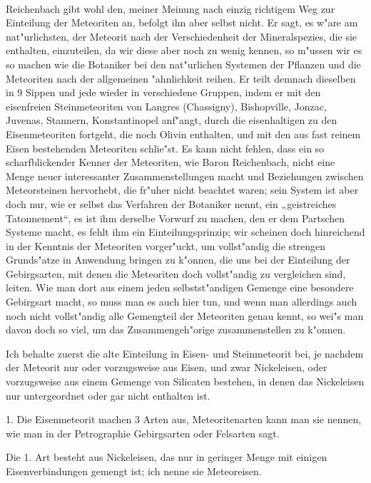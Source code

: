\documentclass[a4paper, 11pt, oneside]{article}
\begin{document}
\paragraph{}
Reichenbach gibt wohl den, meiner Meinung nach einzig richtigem Weg zur Einteilung der Meteoriten an, befolgt ihn aber selbst nicht. Er sagt, es w"are am nat"urlichsten, der Meteorit nach der Verschiedenheit der Mineralspezies, die sie enthalten, einzuteilen, da wir diese aber noch zu wenig kennen, so m"ussen wir es so machen wie die Botaniker bei den nat"urlichen Systemen der Pflanzen und die Meteoriten nach der allgemeinen "ahnlichkeit reihen. Er teilt demnach dieselben in 9 Sippen und jede wieder in verschiedene Gruppen, indem er mit den eisenfreien Steinmeteoriten von Langres (Chassigny), Bishopville, Jonzac, Juvenas, Stannern, Konstantinopel anf"angt, durch die eisenhaltigen zu den Eisenmeteoriten fortgeht, die noch Olivin enthalten, und mit den aus fast reinem Eisen bestehenden Meteoriten schlie"st. Es kann nicht fehlen, dass ein so scharfblickender Kenner der Meteoriten, wie Baron Reichenbach, nicht eine Menge neuer interessanter Zusammenstellungen macht und Beziehungen zwischen Meteorsteinen hervorhebt, die fr"uher nicht beachtet waren; sein System ist aber doch nur, wie er selbst das Verfahren der Botaniker nennt, ein „geistreiches Tatonnement“, es ist ihm derselbe Vorwurf zu machen, den er dem Partschen Systeme macht, es fehlt ihm ein Einteilungsprinzip; wir scheinen doch hinreichend in der Kenntnis der Meteoriten vorger"uckt, um vollst"andig die strengen Grunds"atze in Anwendung bringen zu k"onnen, die uns bei der Einteilung der Gebirgsarten, mit denen die Meteoriten doch vollst"andig zu vergleichen sind, leiten. Wie man dort aus einem jeden selbstst"andigen Gemenge eine besondere Gebirgsart macht, so muss man es auch hier tun, und wenn man allerdings auch noch nicht vollst"andig alle Gemengteil der Meteoriten genau kennt, so wei"s man davon doch so viel, um das Zusammengeh"orige zusammenstellen zu k"onnen.

Ich behalte zuerst die alte Einteilung in Eisen- und Steinmeteorit bei, je nachdem der Meteorit nur oder vorzugsweise aus Eisen, und zwar Nickeleisen, oder vorzugsweise aus einem Gemenge von Silicaten bestehen, in denen das Nickeleisen nur untergeordnet oder gar nicht enthalten ist.

1. Die Eisenmeteorit machen 3 Arten aus, Meteoritenarten kann man sie nennen, wie man in der Petrographie Gebirgsarten oder Felsarten sagt.

Die 1. Art besteht aus Nickeleisen, das nur in geringer Menge mit einigen Eisenverbindungen gemengt ist; ich nenne sie Meteoreisen.
\end{document}
